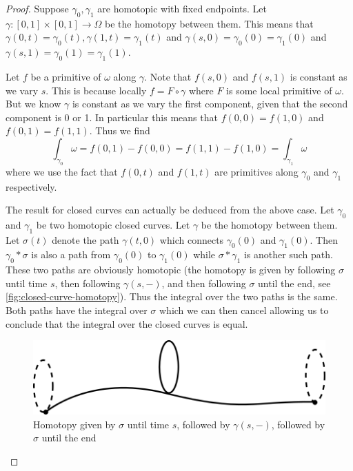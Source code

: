 \begin{proof}
    Suppose $\gamma_0, \gamma_1$ are homotopic with fixed endpoints. Let $\gamma: [0, 1] \times [0, 1] \to \Omega$ be the homotopy between them. This means that $\gamma(0, t) = \gamma_0(t), \gamma(1, t) = \gamma_1(t)$ and $\gamma(s, 0) = \gamma_0(0) = \gamma_1(0)$ and $\gamma(s, 1) = \gamma_0(1) = \gamma_1(1)$. 
    
    Let $f$ be a primitive of $\omega$ along $\gamma$. Note that $f(s, 0)$ and $f(s, 1)$ is constant as we vary $s$. This is because locally $f = F \circ \gamma$ where $F$ is some local primitive of $\omega$. But we know $\gamma$ is constant as we vary the first component, given that the second component is 0 or 1. In particular this means that $f(0, 0) = f(1, 0)$ and $f(0, 1) = f(1, 1)$. Thus we find
    $$ \int_{\gamma_0} \omega = f(0, 1) - f(0, 0) = f(1, 1) - f(1, 0) = \int_{\gamma_1} \omega $$
    where we use the fact that $f(0, t)$ and $f(1, t)$ are primitives along $\gamma_0$ and $\gamma_1$ respectively.

    The result for closed curves can actually be deduced from the above case. Let $\gamma_0$ and $\gamma_1$ be two homotopic closed curves. Let $\gamma$ be the homotopy between them. Let $\sigma(t)$ denote the path $\gamma(t, 0)$ which connects $\gamma_0(0)$ and $\gamma_1(0)$. Then $\gamma_0 * \sigma$ is also a path from $\gamma_0(0)$ to $\gamma_1(0)$ while $\sigma * \gamma_1$ is another such path. These two paths are obviously homotopic (the homotopy is given by following $\sigma$ until time $s$, then following $\gamma(s,-)$, and then following $\sigma$ until the end, see \autoref{fig:closed-curve-homotopy}). Thus the integral over the two paths is the same. Both paths have the integral over $\sigma$ which we can then cancel allowing us to conclude that the integral over the closed curves is equal.

    \begin{figure}
        \centering
        \includegraphics{Images/closed_curve_homotopy.png}
        \caption{Homotopy given by $\sigma$ until time $s$, followed by $\gamma(s,-)$, followed by $\sigma$ until the end}
        \label{fig:closed-curve-homotopy}
    \end{figure}
\end{proof}
